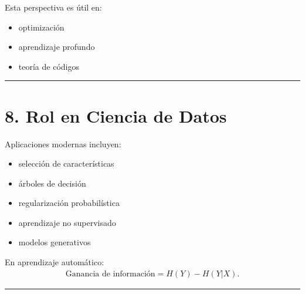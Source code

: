 \documentclass[letterpaper,10pt,english]{jupyterBook}
\begin{document}
\sphinxAtStartPar
Esta perspectiva es útil en:
\begin{itemize}
\item {} 
\sphinxAtStartPar
optimización

\item {} 
\sphinxAtStartPar
aprendizaje profundo

\item {} 
\sphinxAtStartPar
teoría de códigos

\end{itemize}


\bigskip\hrule\bigskip



\section{8. Rol en Ciencia de Datos}
\label{\detokenize{01_theory/entropy:rol-en-ciencia-de-datos}}
\sphinxAtStartPar
Aplicaciones modernas incluyen:
\begin{itemize}
\item {} 
\sphinxAtStartPar
selección de características

\item {} 
\sphinxAtStartPar
árboles de decisión

\item {} 
\sphinxAtStartPar
regularización probabilística

\item {} 
\sphinxAtStartPar
aprendizaje no supervisado

\item {} 
\sphinxAtStartPar
modelos generativos

\end{itemize}

\sphinxAtStartPar
En aprendizaje automático:
\begin{equation*}
\begin{split}
\text{Ganancia de información} = H(Y) - H(Y|X).
\end{split}
\end{equation*}

\bigskip\hrule\bigskip
\end{document}
